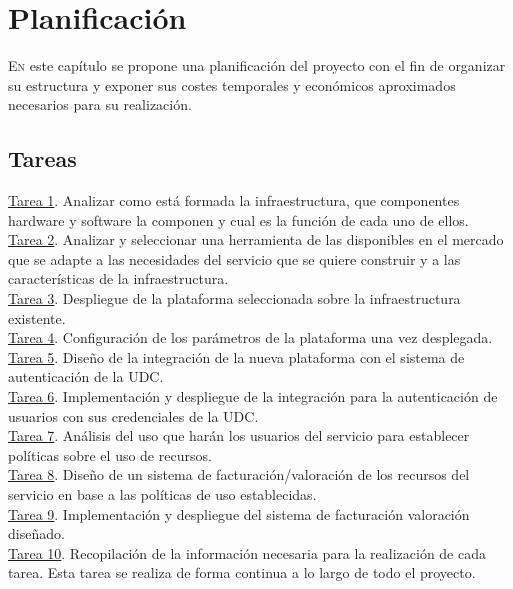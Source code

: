 \chapter{Planificación}
\label{chap:planificacionProyecto}
\lettrine{E}{n} este capítulo se propone una planificación del proyecto con el fin de organizar su estructura y exponer sus costes temporales y económicos aproximados necesarios para su realización.

\section{Tareas}
\underline{Tarea 1}. Analizar como está formada la infraestructura, que componentes hardware y software la componen y cual es la función de cada uno de ellos.\\

\underline{Tarea 2}. Analizar y seleccionar una herramienta de las disponibles en el mercado que se adapte a las necesidades del servicio que se quiere construir y a las características de la infraestructura.\\

\underline{Tarea 3}. Despliegue de la plataforma seleccionada sobre la infraestructura existente.\\

\underline{Tarea 4}. Configuración de los parámetros de la plataforma una vez desplegada.\\

\underline{Tarea 5}. Diseño de la integración de la nueva plataforma con el sistema de autenticación de la UDC.\\

\underline{Tarea 6}. Implementación y despliegue de la integración para la autenticación de usuarios con sus credenciales de la UDC.\\

\underline{Tarea 7}. Análisis del uso que harán los usuarios del servicio para establecer políticas sobre el uso de recursos.\\

\underline{Tarea 8}. Diseño de un sistema de facturación/valoración de los recursos del servicio en base a las políticas de uso establecidas.\\

\underline{Tarea 9}. Implementación y despliegue del sistema de facturación valoración diseñado.\\

\underline{Tarea 10}. Recopilación de la información necesaria para la realización de cada tarea. Esta tarea se realiza de forma continua a lo largo de todo el proyecto.\\

